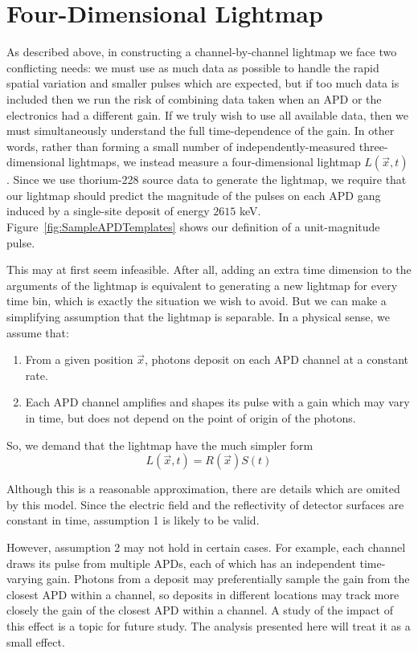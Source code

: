 \section{Four-Dimensional Lightmap}\label{sec:FourDimLightmapParent}

As described above, in constructing a channel-by-channel lightmap we face two conflicting needs: we must use as much data as possible to handle the rapid spatial variation and smaller pulses which are expected, but if too much data is included then we run the risk of combining data taken when an APD or the electronics had a different gain.  If we truly wish to use all available data, then we must simultaneously understand the full time-dependence of the gain.  In other words, rather than forming a small number of independently-measured three-dimensional lightmaps, we instead measure a four-dimensional lightmap $L(\vec{x},t)$.  Since we use thorium-228 source data to generate the lightmap, we require that our lightmap should predict the magnitude of the pulses on each APD gang induced by a single-site deposit of energy $2615$ keV.  Figure~\ref{fig:SampleAPDTemplates} shows our definition of a unit-magnitude pulse.

This may at first seem infeasible.  After all, adding an extra time dimension to the arguments of the lightmap is equivalent to generating a new lightmap for every time bin, which is exactly the situation we wish to avoid.  But we can make a simplifying assumption that the lightmap is separable.  In a physical sense, we assume that:
\begin{enumerate}
\item From a given position $\vec{x}$, photons deposit on each APD channel at a constant rate.
\item Each APD channel amplifies and shapes its pulse with a gain which may vary in time, but does not depend on the point of origin of the photons.
\end{enumerate}
So, we demand that the lightmap have the much simpler form
\begin{equation} \label{eqn:SeparableLightmap}
L(\vec{x},t) = R(\vec{x})S(t)
\end{equation}

Although this is a reasonable approximation, there are details which are omited by this model.  Since the electric field and the reflectivity of detector surfaces are constant in time, assumption 1 is likely to be valid.

However, assumption 2 may not hold in certain cases. For example, each channel draws its pulse from multiple APDs, each of which has an independent time-varying gain.  Photons from a deposit may preferentially sample the gain from the closest APD within a channel, so deposits in different locations may track more closely the gain of the closest APD within a channel.  A study of the impact of this effect is a topic for future study. The analysis presented here will treat it as a small effect.


